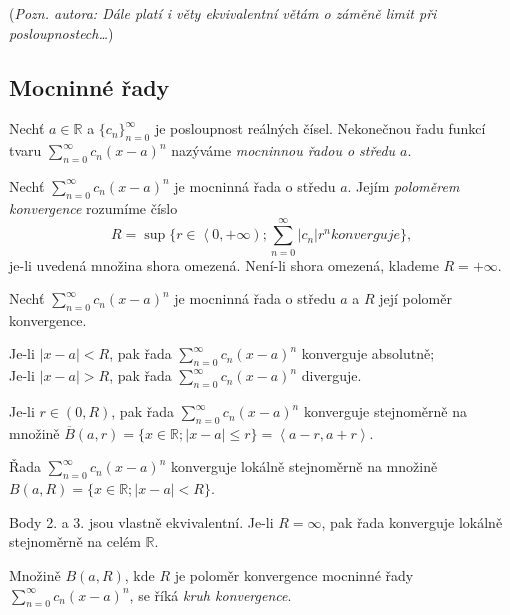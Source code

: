 (\emph{Pozn. autora: Dále platí i věty ekvivalentní větám o záměně limit při posloupnostech\dots})

\subsection{Mocninné řady}

\begin{definice}
Nechť $a \in \mathbb{R}$ a $\{c_n\}_{n=0}^{\infty}$ je posloupnost reálných čísel. Nekonečnou řadu funkcí tvaru $\sum_{n=0}^{\infty} c_n(x-a)^n$ nazýváme \emph{mocninnou řadou o středu $a$}.
\end{definice}

\begin{definice}
Nechť $\sum_{n=0}^{\infty} c_n(x-a)^n$ je mocninná řada o středu $a$. Jejím \emph{poloměrem konvergence} rozumíme číslo
$$R = \sup\{r \in \left<0, +\infty\right); \sum_{n=0}^{\infty}|c_n|r^n \textit{konverguje}\}\textrm{,}$$
je-li uvedená množina shora omezená. Není-li shora omezená, klademe $R = +\infty$.
\end{definice}

\begin{veta}
Nechť $\sum_{n=0}^{\infty} c_n(x-a)^n$ je mocninná řada o středu $a$ a $R$ její poloměr konvergence.
\begin{penumerate}
	\item Je-li $|x-a| < R$, pak řada $\sum_{n=0}^{\infty} c_n(x-a)^n$ konverguje absolutně;\\
		Je-li $|x-a| > R$, pak řada $\sum_{n=0}^{\infty} c_n(x-a)^n$ diverguje.
	\item Je-li $r \in (0,R)$, pak řada $\sum_{n=0}^{\infty} c_n(x-a)^n$ konverguje stejnoměrně na množině $\overline{B}(a,r) = \{x \in \mathbb{R}; |x-a|\le r\}=\left<a-r,a+r\right>$.
	\item Řada $\sum_{n=0}^{\infty} c_n(x-a)^n$ konverguje lokálně stejnoměrně na množině $B(a,R) = \{x \in \mathbb{R}; |x-a| < R\}$.
\end{penumerate}

Body 2. a 3. jsou vlastně ekvivalentní. Je-li $R=\infty$, pak řada konverguje lokálně stejnoměrně na celém $\mathbb{R}$. 
\end{veta}

\begin{poznamka}
Množině $B(a, R)$, kde $R$ je poloměr konvergence mocninné řady $\sum_{n=0}^{\infty} c_n(x-a)^n$, se říká \emph{kruh konvergence}.
\end{poznamka}

